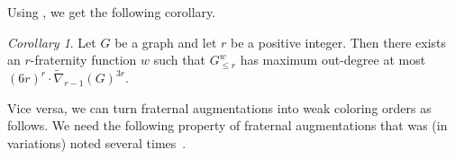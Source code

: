 \documentclass[1p,number,a4paper]{elsarticle}
\theoremstyle{remark}
\DeclareMathOperator{\WReach}{WReach}
\newtheorem{corollary}[theorem]{Corollary}
\newtheorem{definition}[theorem]{Definition}
\newtheorem{lemma}[theorem]{Lemma}
\begin{document}
Using , we get the following corollary. 

\begin{corollary}
Let $G$ be a graph and let $r$ be a positive integer. Then 
there exists an $r$-fraternity function $w$ such that 
$G^w_{\leq r}$ has maximum out-degree at most 
$(6r)^r\cdot\widetilde\nabla_{r-1}(G)^{3r}$.
\end{corollary}

%

Vice versa, we can turn fraternal augmentations 
into weak coloring orders as follows. 
We need the following property of fraternal augmentations 
that was (in variations) noted several times~\cite{dvovrak2013testing, grohe2017deciding,nevsetril2012sparsity,Reidl16,
siebertz2016nowhere}. 
\end{document}

